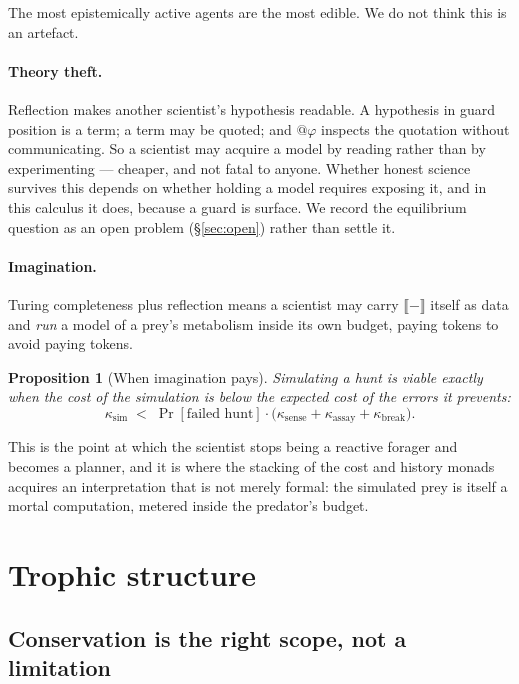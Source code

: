 \documentclass[11pt]{article}
\theoremstyle{plain}
\newtheorem{proposition}[theorem]{Proposition}
\theoremstyle{definition}
\newcommand{\enc}[1]{\llbracket #1 \rrbracket}
\begin{document}
The most epistemically active agents are the most edible. We do not think this is an artefact.

\paragraph{Theory theft.} Reflection makes another scientist's hypothesis readable. A hypothesis in
guard position is a term; a term may be quoted; and $@\varphi$ inspects the quotation without
communicating. So a scientist may acquire a model by reading rather than by experimenting --- cheaper,
and not fatal to anyone. Whether honest science survives this depends on whether holding a model
requires exposing it, and in this calculus it does, because a guard is surface. We record the
equilibrium question as an open problem (\S\ref{sec:open}) rather than settle it.

\paragraph{Imagination.} Turing completeness plus reflection means a scientist may carry $\enc{-}$
itself as data and \emph{run} a model of a prey's metabolism inside its own budget, paying tokens to
avoid paying tokens.

\begin{proposition}[When imagination pays]
\label{prop:imagination}
Simulating a hunt is viable exactly when the cost of the simulation is below the expected cost of the
errors it prevents:
\[
\kappa_{\mathrm{sim}} \;<\; \Pr[\text{failed hunt}] \cdot \big(\kappa_{\mathrm{sense}} +
\kappa_{\mathrm{assay}} + \kappa_{\mathrm{break}}\big).
\]
\end{proposition}

This is the point at which the scientist stops being a reactive forager and becomes a planner, and it
is where the stacking of the cost and history monads acquires an interpretation that is not merely
formal: the simulated prey is itself a mortal computation, metered inside the predator's budget.

\section{Trophic structure}
\label{sec:trophic}

\subsection{Conservation is the right scope, not a limitation}
\end{document}
